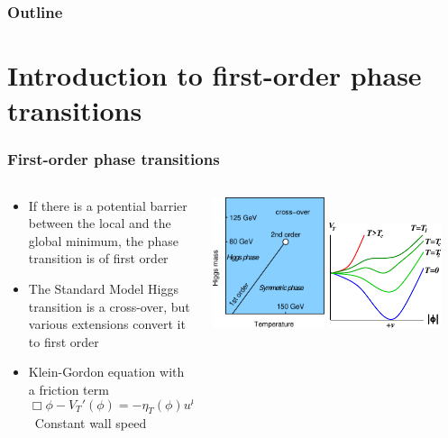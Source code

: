 \begin{frame}
    \titlepage
\end{frame}

\begin{frame}
    \frametitle{Outline}
    \tableofcontents
\end{frame}

\section{Introduction to first-order phase transitions}

\begin{frame}
    \frametitle{First-order phase transitions}
    \begin{columns}
    \begin{column}{0.5\textwidth}
        \begin{itemize}
            \item If there is a potential barrier between the local and the global minimum, the phase transition is of first order
            \item The Standard Model Higgs transition is a cross-over, but various extensions convert it to first order
            \item Klein-Gordon equation with a friction term
            \begin{equation}
                \Box \phi - V_T'(\phi) = - \eta_T(\phi) u^\mu \partial_\mu \phi
            \end{equation}
            \textrightarrow \ Constant wall speed
        \end{itemize}
    \end{column}
    \begin{column}{0.5\textwidth}
        \includegraphics[width=0.45\textwidth]{../fig/smPhaseDiag2}%
        \hfill%
        \includegraphics[width=0.45\textwidth]{../fig/ThermalHiggsPotential}

\end{column}
\end{columns}
\end{frame}
